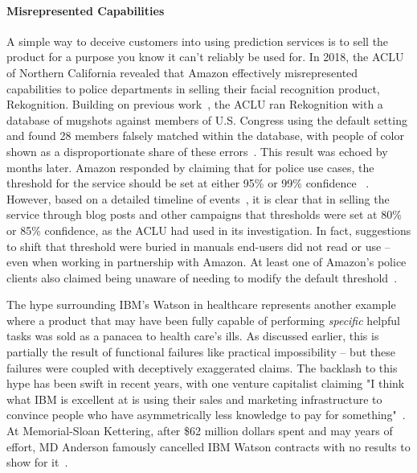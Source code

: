 \documentclass[acmconf,manuscript,screen,natbib=true]{acmart}
\begin{document}
\paragraph{Misrepresented Capabilities}
A simple way to deceive customers into using prediction services is to sell the product for a purpose you know it can't reliably be used for. In 2018, the ACLU of Northern California revealed that Amazon effectively misrepresented capabilities to police departments in selling their facial recognition product, Rekognition. Building on previous work~\cite{Buolamwini_undated-dd}, the ACLU ran Rekognition with a database of mugshots against members of U.S. Congress using the default setting and found 28 members falsely matched within the database, with people of color shown as a disproportionate share of these errors~\cite{Snow2018-vw}. This result was echoed by \citet{raji2019actionable} months later. Amazon responded by claiming that for police use cases, the threshold for the service should be set at either 95\% or 99\% confidence %
~\cite{Wood_undated-ek}. However, based on a detailed timeline of events~\cite{aclu_response_response_fr}, it is clear that in selling the service through blog posts and other campaigns that thresholds were set at 80\% or 85\% confidence, as the ACLU had used in its investigation. In fact, suggestions to shift that threshold were buried in manuals end-users did not read or use -- even when working in partnership with Amazon. At least one of Amazon's police clients also claimed being unaware of needing to modify the default threshold~\cite{menegus2019defense}. 

The hype surrounding IBM's Watson in healthcare represents another example where a product that may have been fully capable of performing \emph{specific} helpful tasks was sold as a panacea to health care's ills. As discussed earlier, this is partially the result of functional failures like practical impossibility -- but these failures were coupled with deceptively exaggerated claims. The backlash to this hype has been swift in recent years, with one venture capitalist claiming "I think what IBM is excellent at is using their sales and marketing infrastructure to convince people who have asymmetrically less knowledge to pay for something"~\cite{Wojcik_undated-nb}. At Memorial-Sloan Kettering, after \$62 million dollars spent and may years of effort, MD Anderson famously cancelled IBM Watson contracts with no results to show for it~\cite{md_anderson_benches_watson}. %
\end{document}
